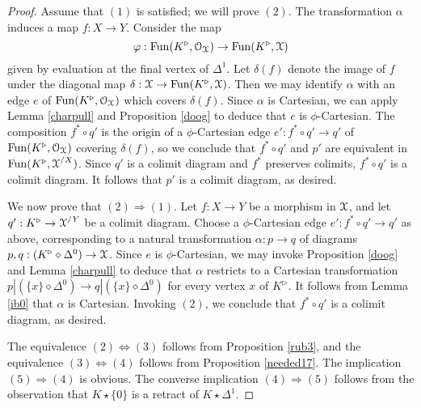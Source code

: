 \begin{proof}
Assume that $(1)$ is satisfied; we will prove $(2)$. The transformation $\alpha$ induces a map $f: X \rightarrow Y$.  Consider the map
$$ \varphi: \operatorname{Fun}(K^{\triangleright}, \operatorname{\mathcal{O}}_{\operatorname{\mathcal{X}}}) \rightarrow \operatorname{Fun}(K^{\triangleright}, \operatorname{\mathcal{X}} )$$
given by evaluation at the final vertex of $\Delta^1$.
Let $\delta(f)$ denote the image of $f$ under the diagonal map $\delta: \operatorname{\mathcal{X}} \rightarrow
\operatorname{Fun}(K^{\triangleright}, \operatorname{\mathcal{X}})$. Then we may identify $\alpha$ with an edge $e$ of
$\operatorname{Fun}(K^{\triangleright}, \operatorname{\mathcal{O}}_{\operatorname{\mathcal{X}}})$ which covers $\delta(f)$. Since $\alpha$ is Cartesian, we can apply Lemma \ref{charpull} and Proposition \ref{doog} to deduce that $e$ is $\phi$-Cartesian.
The composition $f^{\ast} \circ q'$ is the origin of a $\phi$-Cartesian edge $e': f^{\ast} \circ q' \rightarrow q'$ of $\operatorname{Fun}(K^{\triangleright}, \operatorname{\mathcal{O}}_{\operatorname{\mathcal{X}}})$ covering $\delta(f)$, so we conclude that
$f^{\ast} \circ q'$ and $p'$ are equivalent in 
$\operatorname{Fun}(K^{\triangleright}, \operatorname{\mathcal{X}}^{/X})$. Since $q'$ is a colimit diagram and $f^{\ast}$ preserves colimits, $f^{\ast} \circ q'$ is a colimit diagram. It follows that $p'$ is a colimit diagram, as desired.

We now prove that $(2) \Rightarrow (1)$. Let $f: X \rightarrow Y$ be a morphism in $\operatorname{\mathcal{X}}$, and let
$q': K^{\triangleright} \rightarrow \operatorname{\mathcal{X}}^{/Y}$ be a colimit diagram. Choose a $\phi$-Cartesian
edge $e': f^{\ast} \circ q' \rightarrow q'$ as above, corresponding to a natural transformation
$\alpha: p \rightarrow q$ of diagrams $p,q: (K^{\triangleright} \diamond \Delta^0) \rightarrow \operatorname{\mathcal{X}}$.
Since $e$ is $\phi$-Cartesian, we may invoke Proposition \ref{doog} and
Lemma \ref{charpull} to deduce that $\alpha$ restricts to a Cartesian transformation
$p|(\{x\} \diamond \Delta^0) \rightarrow q|( \{x\} \diamond \Delta^0 )$ for every vertex $x$ of
$K^{\triangleright}$. It follows from Lemma \ref{ib0} that $\alpha$ is Cartesian. Invoking $(2)$, we conclude that $f^{\ast} \circ q'$ is a colimit diagram, as desired. 

The equivalence $(2) \Leftrightarrow (3)$ follows from Proposition \ref{rub3}, and the equivalence $(3) \Leftrightarrow (4)$ follows from Proposition \ref{needed17}. The implication $(5) \Rightarrow (4)$ is obvious. The converse implication $(4) \Rightarrow (5)$ follows from the observation that $K \star \{0\}$ is a retract of $K \star \Delta^1$.
\end{proof}

